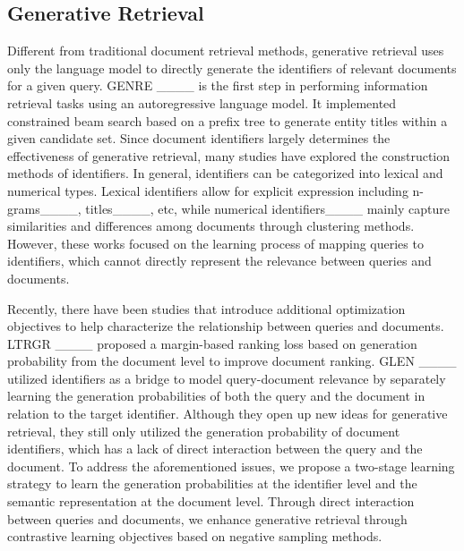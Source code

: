 \subsection{Generative Retrieval}
Different from traditional document retrieval methods, generative retrieval uses only the language model to directly generate the identifiers of relevant documents for a given query. GENRE ____ is the first step in performing information retrieval tasks using an autoregressive language model. It implemented constrained beam search based on a prefix tree to generate entity titles within a given candidate set. 
Since document identifiers largely determines the effectiveness of generative retrieval, many studies have explored the construction methods of identifiers. 
In general, identifiers can be categorized into lexical and numerical types. Lexical identifiers allow for explicit expression including n-grams____, titles____, etc, while numerical identifiers____ mainly capture similarities and differences among documents through clustering methods. 
However, these works focused on the learning process of mapping queries to identifiers, which cannot directly represent the relevance between queries and documents.

Recently, there have been studies that introduce additional optimization objectives to help characterize the relationship between queries and documents.
LTRGR ____ proposed a margin-based ranking loss based on generation probability from the document level to improve document ranking.
GLEN ____ utilized identifiers as a bridge to model query-document relevance by separately learning the generation probabilities of both the query and the document in relation to the target identifier.
Although they open up new ideas for generative retrieval, they still only utilized the generation probability of document identifiers, which has a lack of direct interaction between the query and the document.
To address the aforementioned issues, we propose a two-stage learning strategy to learn the generation probabilities at the identifier level and the semantic representation at the document level.  
Through direct interaction between queries and documents, we enhance generative retrieval through contrastive learning objectives based on negative sampling methods.